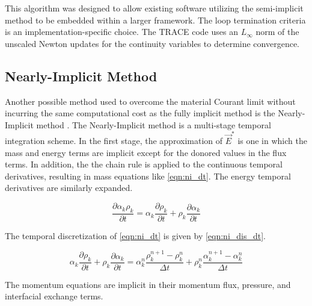This algorithm was designed to allow existing software utilizing the semi-implicit method to be embedded within a larger framework.
The loop termination criteria is an implementation-specific choice.
The TRACE code uses an $L_{\infty}$ norm of the unscaled Newton updates for the continuity variables to determine convergence.

\subsection{Nearly-Implicit Method}
\label{subsect:numerics_nearly_implicit}
Another possible method used to overcome the material Courant limit without incurring the same computational cost as the fully implicit method is the Nearly-Implicit method \cite{Trapp1986, RELAP}.
The Nearly-Implicit method is a multi-stage temporal integration scheme.
In the first stage, the approximation  of $\vec{E}^{*}$ is one in which the mass and energy terms are implicit except for the donored values in the flux terms. 
In addition, the the chain rule is applied to the continuous temporal derivatives, resulting in mass equations like \eqref{eqn:ni_dt}.
The energy temporal derivatives are similarly expanded.

\begin{equation}
\label{eqn:ni_dt}
\frac{\partial \alpha_k \rho_k}{\partial t} = \alpha_k \frac{\partial \rho_k}{\partial t} + \rho_k \frac{\partial \alpha_k}{\partial t}
\end{equation}

The temporal discretization of \eqref{eqn:ni_dt} is given by \eqref{eqn:ni_dis_dt}.

\begin{equation}
\label{eqn:ni_dis_dt}
\alpha_k \frac{\partial \rho_k}{\partial t} + \rho_k \frac{\partial \alpha_k}{\partial t} = \alpha^n_k\frac{ \rho^{n+1}_k - \rho^{n}_k}{\Delta t} + \rho^{n}_k\frac{\alpha^{n+1}_k - \alpha^{n}_k}{\Delta t}
\end{equation}

The momentum equations are implicit in their momentum flux, pressure, and interfacial exchange terms.


